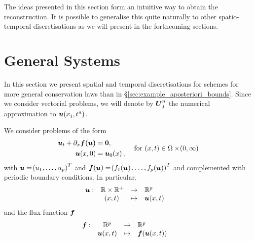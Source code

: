 \documentclass[final]{amsart}
\renewcommand{\dfunkmapsto}[5]{\ensuremath{
		\begin{array}{rccl}
			{#1}: & {#2} &\to&{#3}
			\\
			& {#4} &\mapsto&{#5}
		\end{array}\quad}}
\renewcommand{\vect}[1]{\geovec{#1}}
\renewcommand{\vec}[1]{\geovec{#1}}
\numberwithin{equation}{section}
\begin{document}
The ideas presented in this section form an intuitive way to obtain
the reconstruction. It is possible to generalise this quite naturally
to other spatio-temporal discretisations as we will present in the
forthcoming sections.

\section{General Systems}\label{sec:numerical_discretisation}



In this section we present spatial and temporal discretisations for schemes for more general conservation laws than in \S\ref{sec:example_aposteriori_bounds}.  Since we consider vectorial problems, we will denote by $\vec{U}^n_j$ the numerical approximation to $\vec u\qp{x_j, t^n}$.  
\begin{Rem} We consider problems of the form
	\begin{equation}\label{eq_1d_gen_cons_law}
	\begin{aligned}
	\vect{u}_t+\partial_x\vect{f\qp{\vect{u}}}&=\vect{0},\\
	\vect{u}\qp{x,0}&=\vect{u}_0\qp{x},
	\end{aligned}\quad \text{ for } \qp{x,t}\in \W\times\qp{0,\infty}
	\end{equation}
	with $\vect{u}=\qp{u_1,\dots,u_p}^T$ and $\vect{f}\qp{\vect{u}}=\qp{f_1\qp{\vect{u}},\dots,f_p\qp{\vect{u}}}^T$ and complemented with periodic boundary conditions.
	In particular,
	\begin{equation}
	\dfunkmapsto{\vec{u}}{\mathbb{R}\times\mathbb{R}^+}{\mathbb{R}^p}{\qp{x,t}}{\vect{u}\qp{x,t}}
	\end{equation}
	and the flux function $\vect{f}$
	\begin{equation}
	\dfunkmapsto{\vec{f}}{\mathbb{R}^p}{\mathbb{R}^p}{\vect{u}\qp{x,t}}{\vect{f}\qp{\vect{u}\qp{x,t}}}
	\end{equation}
\end{Rem}
\end{document}
